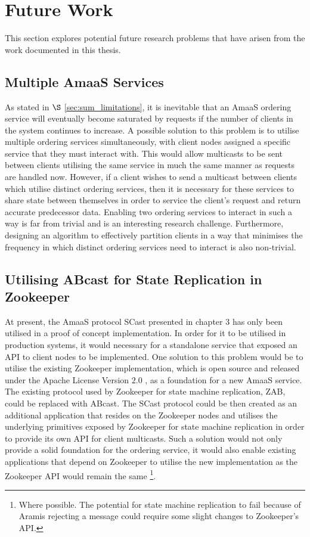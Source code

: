 \section{Future Work}
This section explores potential future research problems that have arisen from the work documented in this thesis.

    \subsection{Multiple AmaaS Services}
    As stated in $\S$ \ref{sec:sum_limitations}, it is inevitable that an \textsf{AmaaS} ordering service will eventually become saturated by requests if the number of clients in the system continues to increase.  A possible solution to this problem is to utilise multiple ordering services simultaneously, with client nodes assigned a specific service that they must interact with.  This would allow multicasts to be sent between clients utilising the same service in much the same manner as requests are handled now.  However, if a client wishes to send a multicast between clients which utilise distinct ordering services, then it is necessary for these services to share state between themselves in order to service the client's request and return accurate predecessor data.  Enabling two ordering services to interact in such a way is far from trivial and is an interesting research challenge.  Furthermore, designing an algorithm to effectively partition clients in a way that minimises the frequency in which distinct ordering services need to interact is also non-trivial.  
        
    \subsection{Utilising ABcast for State Replication in Zookeeper}\label{sec:sum_fw_zoo}
    At present, the \textsf{AmaaS} protocol \textsf{SCast} presented in chapter 3 has only been utilised in a proof of concept implementation.  In order for it to be utilised in production systems, it would necessary for a standalone service that exposed an API to client nodes to be implemented.  One solution to this problem would be to utilise the existing Zookeeper implementation, which is open source and released under the Apache License Version $2.0$ \citep{ApacheLicense}, as a foundation for a new \textsf{AmaaS} service.  The existing protocol used by Zookeeper for state machine replication, ZAB, could be replaced with \textsf{ABcast}.  The \textsf{SCast} protocol could be then created as an additional application that resides on the Zookeeper nodes and utilises the underlying primitives exposed by Zookeeper for state machine replication in order to provide its own API for client multicasts.  Such a solution would not only provide a solid foundation for the ordering service, it would also enable existing applications that depend on Zookeeper to utilise the new implementation as the Zookeeper API would remain the same \footnote{Where possible.  The potential for state machine replication to fail because of \textsf{Aramis} rejecting a message could require some slight changes to Zookeeper's API.}.          
        
